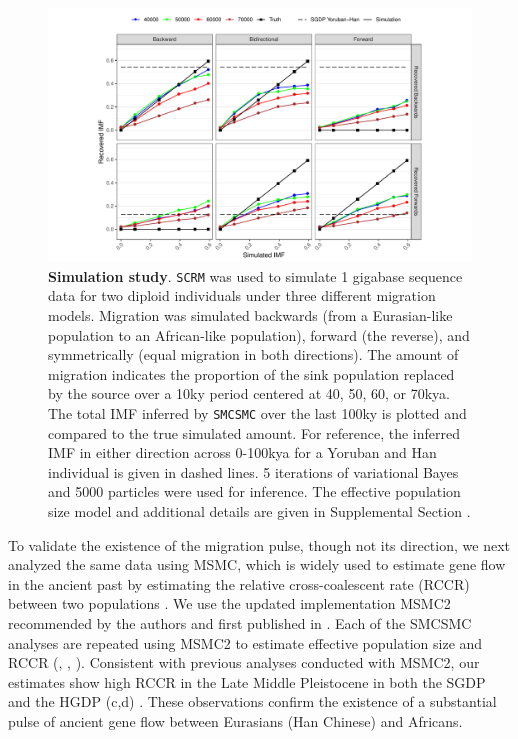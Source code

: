 \begin{figure}
  \centering
  \includegraphics[width=\textwidth]{plot/sim_line_plot.pdf}
  \caption[Simulation Study]{\textbf{Simulation study}. {\tt SCRM} was used to simulate 1 gigabase sequence data for two diploid individuals under three different migration models. Migration was simulated backwards (from a Eurasian-like population to an African-like population), forward (the reverse), and symmetrically (equal migration in both directions). The amount of migration indicates the proportion of the sink population replaced by the source over a 10ky period centered at 40, 50, 60, or 70kya. The total IMF inferred by {\tt SMCSMC} over the last 100ky is plotted and compared to the true simulated amount. For reference, the inferred IMF in either direction across 0-100kya for a Yoruban and Han individual is given in dashed lines.  5 iterations of variational Bayes and 5000 particles were used for inference. The effective population size model and additional details are given in Supplemental Section .}
  \label{fig:sim}
\end{figure}


To validate the existence of the migration pulse, though not its direction, we next analyzed the same data using MSMC, which is widely used to estimate gene flow in the ancient past by estimating the relative cross-coalescent rate (RCCR) between two populations \cite{Schiffels2014,Fan2019, Pagani2015, Raghavan2015}. We use the updated implementation MSMC2 recommended by the authors and first published in \cite{Malaspinas2016}. Each of the SMCSMC analyses are repeated using MSMC2 to estimate effective population size and RCCR (, , ). Consistent with previous analyses conducted with MSMC2, our estimates show high RCCR in the Late Middle Pleistocene in both the SGDP and the HGDP (c,d) \cite{Fan2019, Bergstrom2019}. These observations confirm the existence of a substantial pulse of ancient gene flow between Eurasians (Han Chinese) and Africans.



